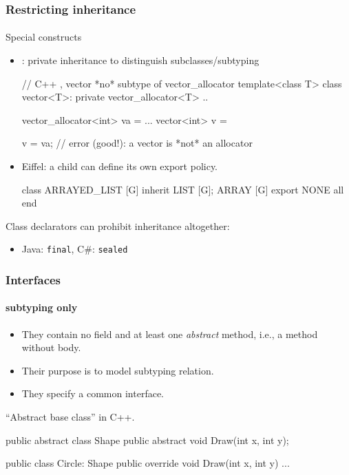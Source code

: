 \documentclass{beamer}
\begin{document}
\begin{frame}[fragile]
\frametitle{Restricting inheritance}
\framesubtitle{}
Special constructs 
\begin{itemize}
\item \Cpp: private inheritance to distinguish subclasses/subtyping
\begin{cplus3}
// C++ , vector *no* subtype of vector_allocator
template<class T>
class vector<T>: private vector_allocator<T>  {..}

vector_allocator<int> va = ...
vector<int> v = 

v = va;  // error (good!): a vector is *not* an allocator
\end{cplus3}
\item Eiffel: a child can define its own export policy.
\begin{eiffel}
class ARRAYED_LIST [G] inherit 
    LIST [G]; 
    ARRAY [G]
    export {NONE} all end

\end{eiffel}
\end{itemize}

Class declarators
can prohibit inheritance altogether:
\begin{itemize}
\item Java: \texttt{final}, C\#: \texttt{sealed}
\end{itemize} 
\end{frame}

\begin{frame}[fragile]

\frametitle{Interfaces}
\framesubtitle{subtyping only}

\begin{itemize}
\item They contain no field and at least one \textit{abstract} method, i.e., 
a method without body. 
\item Their purpose is to model subtyping relation.
\item They specify a common interface. 
\end{itemize}

``Abstract base class'' in C++.

\begin{cplus3}
public abstract class Shape {
    public abstract void Draw(int x, int y);
}

public class Circle: Shape {
    public override void Draw(int x, int y) { ... }
}
\end{cplus3}
\end{frame}
\end{document}
